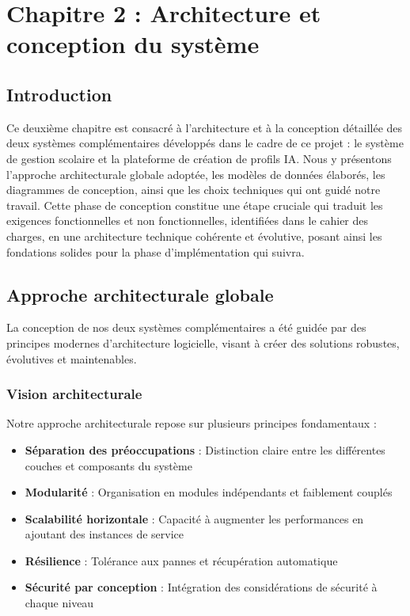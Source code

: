 \chapter*{Chapitre 2 : Architecture et conception du système}
\thispagestyle{fancy}
\setcounter{section}{0}
\newpage

\section{Introduction}

Ce deuxième chapitre est consacré à l'architecture et à la conception détaillée des deux systèmes complémentaires développés dans le cadre de ce projet : le système de gestion scolaire et la plateforme de création de profils IA. Nous y présentons l'approche architecturale globale adoptée, les modèles de données élaborés, les diagrammes de conception, ainsi que les choix techniques qui ont guidé notre travail. Cette phase de conception constitue une étape cruciale qui traduit les exigences fonctionnelles et non fonctionnelles, identifiées dans le cahier des charges, en une architecture technique cohérente et évolutive, posant ainsi les fondations solides pour la phase d'implémentation qui suivra.

\section{Approche architecturale globale}

La conception de nos deux systèmes complémentaires a été guidée par des principes modernes d'architecture logicielle, visant à créer des solutions robustes, évolutives et maintenables.

\subsection{Vision architecturale}

Notre approche architecturale repose sur plusieurs principes fondamentaux :

\begin{itemize}
  \item \textbf{Séparation des préoccupations} : Distinction claire entre les différentes couches et composants du système
  
  \item \textbf{Modularité} : Organisation en modules indépendants et faiblement couplés
  
  \item \textbf{Scalabilité horizontale} : Capacité à augmenter les performances en ajoutant des instances de service
  
  \item \textbf{Résilience} : Tolérance aux pannes et récupération automatique
  
  \item \textbf{Sécurité par conception} : Intégration des considérations de sécurité à chaque niveau
\end{itemize}

